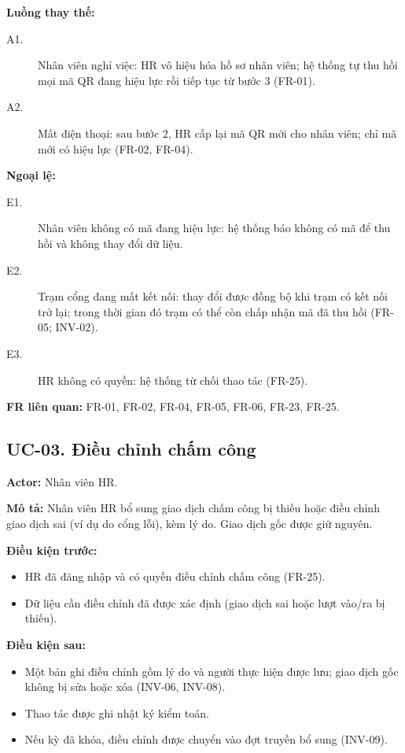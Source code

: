\noindent\textbf{Luồng thay thế:}
\begin{description}
    \item[A1.] Nhân viên nghỉ việc: HR vô hiệu hóa hồ sơ nhân viên; hệ thống tự thu hồi mọi mã QR đang hiệu lực rồi tiếp tục từ bước 3 (FR-01).
    \item[A2.] Mất điện thoại: sau bước 2, HR cấp lại mã QR mới cho nhân viên; chỉ mã mới có hiệu lực (FR-02, FR-04).
\end{description}

\noindent\textbf{Ngoại lệ:}
\begin{description}
    \item[E1.] Nhân viên không có mã đang hiệu lực: hệ thống báo không có mã để thu hồi và không thay đổi dữ liệu.
    \item[E2.] Trạm cổng đang mất kết nối: thay đổi được đồng bộ khi trạm có kết nối trở lại; trong thời gian đó trạm có thể còn chấp nhận mã đã thu hồi (FR-05; INV-02).
    \item[E3.] HR không có quyền: hệ thống từ chối thao tác (FR-25).
\end{description}

\noindent\textbf{FR liên quan:} FR-01, FR-02, FR-04, FR-05, FR-06, FR-23, FR-25.

\subsection{UC-03. Điều chỉnh chấm công}

\noindent\textbf{Actor:} Nhân viên HR.

\noindent\textbf{Mô tả:} Nhân viên HR bổ sung giao dịch chấm công bị thiếu hoặc điều chỉnh giao dịch sai (ví dụ do cổng lỗi), kèm lý do. Giao dịch gốc được giữ nguyên.

\noindent\textbf{Điều kiện trước:}
\begin{itemize}
    \item HR đã đăng nhập và có quyền điều chỉnh chấm công (FR-25).
    \item Dữ liệu cần điều chỉnh đã được xác định (giao dịch sai hoặc lượt vào/ra bị thiếu).
\end{itemize}

\noindent\textbf{Điều kiện sau:}
\begin{itemize}
    \item Một bản ghi điều chỉnh gồm lý do và người thực hiện được lưu; giao dịch gốc không bị sửa hoặc xóa (INV-06, INV-08).
    \item Thao tác được ghi nhật ký kiểm toán.
    \item Nếu kỳ đã khóa, điều chỉnh được chuyển vào đợt truyền bổ sung (INV-09).
\end{itemize}

